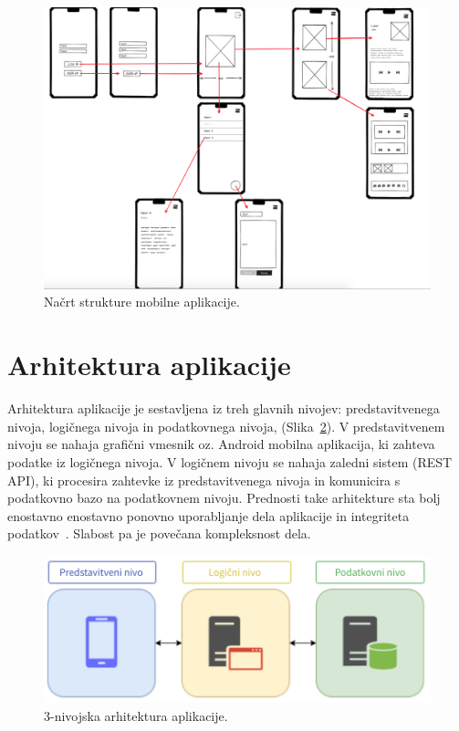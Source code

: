 \documentclass[a4paper, 12pt]{book}
\begin{document}
\begin{figure}[htbp]
\begin{center}
\includegraphics[scale=.35]{wireframes.png}
\end{center}
\caption{Načrt strukture mobilne aplikacije.}
\label{wireframe}
\end{figure}


\section{Arhitektura aplikacije}
Arhitektura aplikacije je sestavljena iz treh glavnih nivojev: predstavitvenega nivoja, logičnega nivoja in podatkovnega nivoja, (Slika~\ref{arh}). V predstavitvenem nivoju se nahaja grafični vmesnik oz. Android mobilna aplikacija, ki zahteva podatke iz logičnega nivoja. V logičnem nivoju se nahaja zaledni sistem (REST API), ki procesira zahtevke iz predstavitvenega nivoja in komunicira s podatkovno bazo na podatkovnem nivoju. Prednosti take arhitekture sta bolj enostavno enostavno ponovno uporabljanje dela aplikacije in integriteta podatkov~\cite{arhitektura}. Slabost pa je povečana kompleksnost dela.\\

\begin{figure}[htbp]
\begin{center}
\includegraphics[scale=0.9]{arhitektura.png}
\end{center}
\caption{3-nivojska arhitektura aplikacije.}
\label{arh}
\end{figure}
\end{document}
